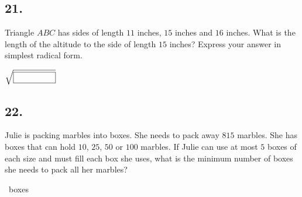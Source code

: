 \documentclass[12pt]{article}
\begin{document}
\subsection*{21.}
Triangle $ABC$ has sides of length $11$ inches, $15$ inches and $16$ inches. What is the length of the altitude to the side of length $15$ inches? Express your answer in simplest radical form. 

\nopagebreak

\fbox{\phantom{ANSWER}}$\sqrt{\fbox{\phantom{ANSWER}}}$

\begin{answer}
%
\end{answer}


\subsection*{22.}
Julie is packing marbles into boxes. She needs to pack away $815$ marbles. She has boxes that can hold $10$, $25$, $50$ or $100$ marbles. If Julie can use at most $5$ boxes of each size and must fill each box she uses, what is the minimum number of boxes she needs to pack all her marbles?

\nopagebreak

\fbox{\phantom{ANSWER}}~boxes

\begin{answer}
%
\end{answer}
\end{document}

